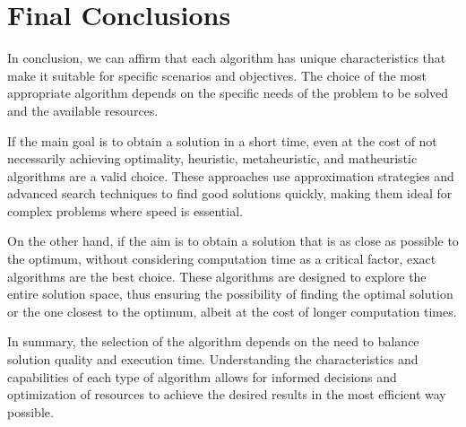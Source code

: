\section{Final Conclusions}
In conclusion, we can affirm that each algorithm has unique characteristics that make it suitable for specific scenarios and objectives. The choice of the most appropriate algorithm depends on the specific needs of the problem to be solved and the available resources.

If the main goal is to obtain a solution in a short time, even at the cost of not necessarily achieving optimality, heuristic, metaheuristic, and matheuristic algorithms are a valid choice. These approaches use approximation strategies and advanced search techniques to find good solutions quickly, making them ideal for complex problems where speed is essential.

On the other hand, if the aim is to obtain a solution that is as close as possible to the optimum, without considering computation time as a critical factor, exact algorithms are the best choice. These algorithms are designed to explore the entire solution space, thus ensuring the possibility of finding the optimal solution or the one closest to the optimum, albeit at the cost of longer computation times.

In summary, the selection of the algorithm depends on the need to balance solution quality and execution time. Understanding the characteristics and capabilities of each type of algorithm allows for informed decisions and optimization of resources to achieve the desired results in the most efficient way possible.